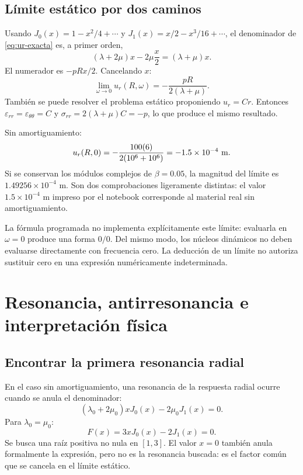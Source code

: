 \documentclass[11pt,a4paper]{report}
\numberwithin{equation}{chapter}
\begin{document}
\section{L\'imite est\'atico por dos caminos}
Usando $J_0(x)=1-x^2/4+\cdots$ y
$J_1(x)=x/2-x^3/16+\cdots$, el denominador de
\eqref{eq:ur-exacta} es, a primer orden,
\begin{equation}
 (\lambda+2\mu)x-2\mu\frac{x}{2}
       =(\lambda+\mu)x.
\end{equation}
El numerador es $-pRx/2$. Cancelando $x$:
\begin{equation}
 \boxed{\lim_{\omega\to0}u_r(R,\omega)
       =-\frac{pR}{2(\lambda+\mu)}.}
 \label{eq:limite-estatico}
\end{equation}
Tambi\'en se puede resolver el problema est\'atico proponiendo
$u_r=Cr$. Entonces $\varepsilon_{rr}=\varepsilon_{\theta\theta}=C$ y
$\sigma_{rr}=2(\lambda+\mu)C=-p$, lo que produce el mismo resultado.

Sin amortiguamiento:
\begin{equation}
 u_r(R,0)=-\frac{100(6)}{2(10^6+10^6)}
         =-1.5\times10^{-4}\ {\rm m}.
\end{equation}
Si se conservan los m\'odulos complejos de $\beta=0.05$, la magnitud del
l\'imite es $1.49256\times10^{-4}$ m. Son dos comprobaciones ligeramente
distintas: el valor $1.5\times10^{-4}$ m impreso por el notebook corresponde
al material real sin amortiguamiento.

\begin{cuidado}
La f\'ormula programada no implementa expl\'icitamente este l\'imite:
evaluarla en $\omega=0$ produce una forma $0/0$. Del mismo modo,
los n\'ucleos din\'amicos no deben evaluarse directamente con frecuencia
cero. La deducci\'on de un l\'imite no autoriza sustituir cero en una
expresi\'on num\'ericamente indeterminada.
\end{cuidado}

\chapter{Resonancia, antirresonancia e interpretaci\'on f\'isica}
\label{ch:resonancia}

\section{Encontrar la primera resonancia radial}
En el caso sin amortiguamiento, una resonancia de la respuesta radial
ocurre cuando se anula el denominador:
\begin{equation}
 (\lambda_0+2\mu_0)xJ_0(x)-2\mu_0J_1(x)=0.
\end{equation}
Para $\lambda_0=\mu_0$:
\begin{equation}
  F(x)=3xJ_0(x)-2J_1(x)=0.
\end{equation}
Se busca una ra\'iz positiva no nula en $[1,3]$. El valor $x=0$ tambi\'en
anula formalmente la expresi\'on, pero no es la resonancia buscada: es el
factor com\'un que se cancela en el l\'imite est\'atico.
\end{document}
